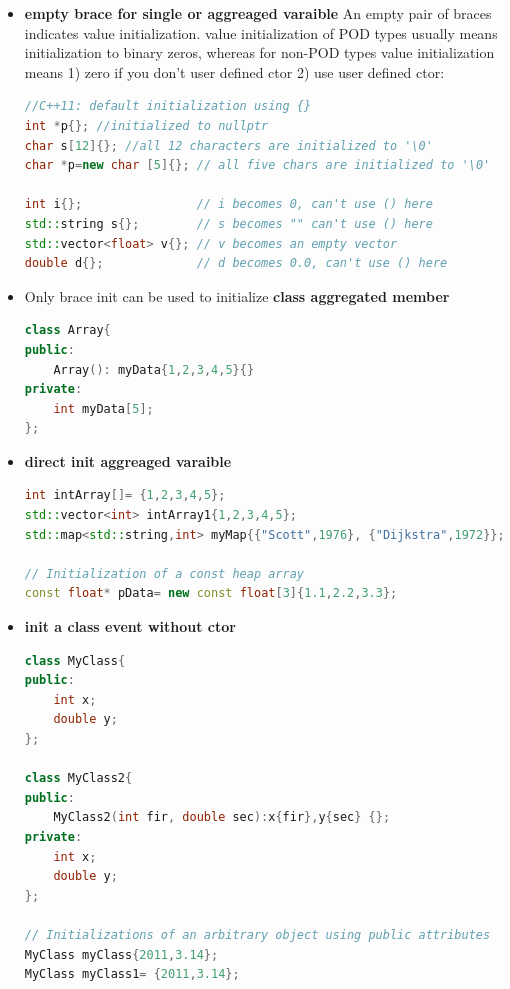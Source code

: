 \documentclass[a4paper,12pt,twoside]{book}
\begin{document}
\begin{itemize}
	\item \textbf{empty brace for single or aggreaged varaible} An empty pair of braces indicates value initialization. value initialization of POD types usually means initialization to binary zeros, whereas for non-POD types value initialization means 1) zero if you don't user defined ctor 2) use user defined ctor:

\begin{lstlisting}[frame=single, language=c++,mathescape=true]
//C++11: default initialization using {}
int *p{}; //initialized to nullptr
char s[12]{}; //all 12 characters are initialized to '\0'
char *p=new char [5]{}; // all five chars are initialized to '\0'
	
int i{};                // i becomes 0, can't use () here
std::string s{};        // s becomes "" can't use () here
std::vector<float> v{}; // v becomes an empty vector
double d{};             // d becomes 0.0, can't use () here
\end{lstlisting}
	
	\item Only brace init can be used to initialize \textbf{class aggregated member}

\begin{lstlisting}[frame=single, language=c++,mathescape=true]
class Array{
public:
	Array(): myData{1,2,3,4,5}{}    
private:
	int myData[5];
};
\end{lstlisting}

\item \textbf{direct init aggreaged varaible}
\begin{lstlisting}[frame=single, language=c++,mathescape=true]
int intArray[]= {1,2,3,4,5};   
std::vector<int> intArray1{1,2,3,4,5};  
std::map<std::string,int> myMap{{"Scott",1976}, {"Dijkstra",1972}};
	
// Initialization of a const heap array
const float* pData= new const float[3]{1.1,2.2,3.3};
\end{lstlisting}
	
\item \textbf{ init a class event without ctor}
\begin{lstlisting}[frame=single, language=c++,mathescape=true]
class MyClass{			
public: 
	int x;
	double y;
};
	
class MyClass2{		
public:
	MyClass2(int fir, double sec):x{fir},y{sec} {};
private: 
	int x;
	double y;
};
	
// Initializations of an arbitrary object using public attributes	
MyClass myClass{2011,3.14};      
MyClass myClass1= {2011,3.14};    
	

\end{lstlisting}
\end{itemize}
\end{document}
